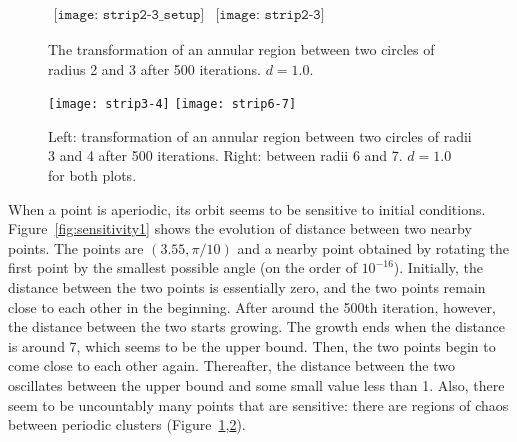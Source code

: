 \documentclass[10pt,twoside]{book}
\begin{document}
\begin{figure}[p]
  \begin{center}
    $
    \begin{array}{l}
      \texttt{[image: strip2-3\_setup]}
    \end{array}
    $\scalebox{1.75}{$\Rar$}$
    \begin{array}{l}
      \texttt{[image: strip2-3]}
    \end{array}
    $
    \caption{
      The transformation of an annular region between two circles of radius 2 and 3 after 500 iterations.
      $d = 1.0$.
    }
    \label{fig:strip2-3}
  \end{center}
\end{figure}

\begin{figure}[p]
  \begin{center}
    \texttt{[image: strip3-4]}
    \texttt{[image: strip6-7]}
    \caption{Left: transformation of an annular region between two circles of radii 3 and 4 after 500 iterations.
      Right: between radii 6 and 7.
      $d = 1.0$ for both plots.
    }
    \label{fig:strip3-4-6-7}
  \end{center}
\end{figure}

When a point is aperiodic, its orbit seems to be sensitive to initial conditions.
Figure~\ref{fig:sensitivity1} shows the evolution of distance between two nearby points.
The points are $(3.55,\pi/10)$ and a nearby point obtained by rotating the first point by the smallest possible angle (on the order of $10^{-16}$).
Initially, the distance between the two points is essentially zero, and the two points remain close to each other in the beginning.
After around the 500th iteration, however, the distance between the two starts growing.
The growth ends when the distance is around 7, which seems to be the upper bound.
Then, the two points begin to come close to each other again.
Thereafter, the distance between the two oscillates between the upper bound and some small value less than 1.
Also, there seem to be uncountably many points that are sensitive: there are regions of chaos between periodic clusters (Figure~\ref{fig:strip2-3},\ref{fig:strip3-4-6-7}).
\end{document}
